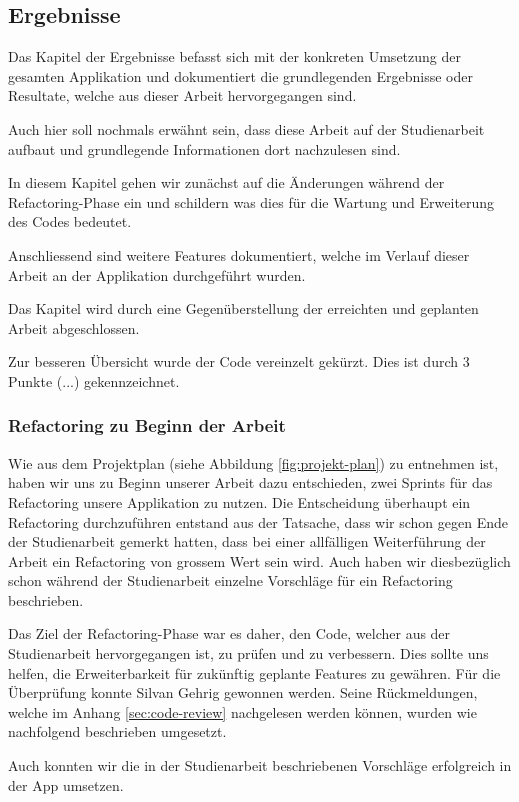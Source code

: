 \subsection{Ergebnisse}
Das Kapitel der Ergebnisse befasst sich mit der konkreten Umsetzung der gesamten Applikation und dokumentiert die grundlegenden Ergebnisse oder Resultate, welche aus dieser Arbeit hervorgegangen sind. 

Auch hier soll nochmals erwähnt sein, dass diese Arbeit auf der Studienarbeit \cite{methode635-sa} aufbaut und grundlegende Informationen dort nachzulesen sind. 

In diesem Kapitel gehen wir zunächst auf die Änderungen während der Refactoring-Phase ein und schildern was dies für die Wartung und Erweiterung des Codes bedeutet. 

Anschliessend sind weitere Features dokumentiert, welche im Verlauf dieser Arbeit an der Applikation durchgeführt wurden.

Das Kapitel wird durch eine Gegenüberstellung der erreichten und geplanten Arbeit abgeschlossen.

Zur besseren Übersicht wurde der Code vereinzelt gekürzt. Dies ist durch 3 Punkte (...) gekennzeichnet.

\subsubsection{Refactoring zu Beginn der Arbeit}
Wie aus dem Projektplan (siehe Abbildung \ref{fig:projekt-plan}) zu entnehmen ist, haben wir uns zu Beginn unserer Arbeit dazu entschieden, zwei Sprints für das Refactoring unsere Applikation zu nutzen. Die Entscheidung überhaupt ein Refactoring durchzuführen entstand aus der Tatsache, dass wir schon gegen Ende der Studienarbeit gemerkt hatten, dass bei einer allfälligen Weiterführung der Arbeit ein Refactoring von grossem Wert sein wird. Auch haben wir diesbezüglich schon während der Studienarbeit einzelne Vorschläge für ein Refactoring beschrieben.


Das Ziel der Refactoring-Phase war es daher, den Code, welcher aus der Studienarbeit hervorgegangen ist, zu prüfen und zu verbessern. Dies sollte uns helfen, die Erweiterbarkeit für zukünftig geplante Features zu gewähren. Für die Überprüfung konnte Silvan Gehrig gewonnen werden. Seine Rückmeldungen, welche im Anhang \ref{sec:code-review} nachgelesen werden können, wurden wie nachfolgend beschrieben umgesetzt.

Auch konnten wir die in der Studienarbeit beschriebenen Vorschläge erfolgreich in der App umsetzen.
 

